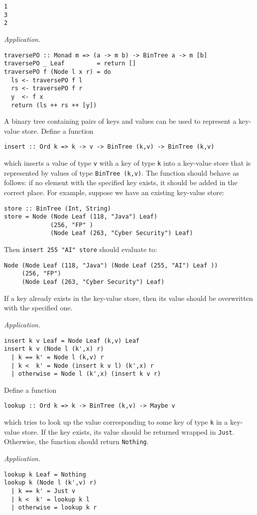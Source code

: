 \begin{parts}
\begin{subparts}
\texttt{1}\\
\texttt{3}\\
\texttt{2}  \droppoints 
\begin{solution}
\emph{Application.}
\begin{verbatim}
traversePO :: Monad m => (a -> m b) -> BinTree a -> m [b]
traversePO _ Leaf         = return []
traversePO f (Node l x r) = do 
  ls <- traversePO f l 
  rs <- traversePO f r
  y  <- f x
  return (ls ++ rs ++ [y])
\end{verbatim}
\end{solution}
\subpart[4] A binary tree containing pairs of keys and values can be used to represent a key-value store. Define a function 
\begin{center}
	\texttt{insert :: Ord k => k -> v -> BinTree (k,v) -> BinTree (k,v)}
\end{center}
which inserts a value of type \texttt{v} with a key of type \texttt{k} into a key-value store that is represented by values of type \texttt{BinTree (k,v)}. The function should behave as follows: if no element with the specified key exists, it should be added in the correct place. For example, suppose we have an existing key-value store:
\begin{verbatim}
store :: BinTree (Int, String)
store = Node (Node Leaf (118, "Java") Leaf) 
             (256, "FP" ) 
             (Node Leaf (263, "Cyber Security") Leaf)
\end{verbatim}
Then \texttt{insert 255 "AI" store} should evaluate to:
\begin{verbatim}
Node (Node Leaf (118, "Java") (Node Leaf (255, "AI") Leaf )) 
     (256, "FP") 
     (Node Leaf (263, "Cyber Security") Leaf)
\end{verbatim}
If a key already exists in the key-value store, then its value should be overwritten with the specified one. \droppoints 
\begin{solution}
\emph{Application.}
\begin{verbatim}
insert k v Leaf = Node Leaf (k,v) Leaf 
insert k v (Node l (k',x) r)
  | k == k' = Node l (k,v) r
  | k <  k' = Node (insert k v l) (k',x) r
  | otherwise = Node l (k',x) (insert k v r)
\end{verbatim}
\end{solution}
\pagebreak
\subpart[4] Define a function 
\begin{center}
	\texttt{lookup :: Ord k => k -> BinTree (k,v) -> Maybe v}
\end{center}
which tries to look up the value corresponding to some key of type \texttt{k} in a key-value store. If the key exists, its value should be returned wrapped in \texttt{Just}. Otherwise, the function should return \texttt{Nothing}. \droppoints 
\begin{solution}
\emph{Application.}
\begin{verbatim}
lookup k Leaf = Nothing 
lookup k (Node l (k',v) r)
  | k == k' = Just v 
  | k <  k' = lookup k l 
  | otherwise = lookup k r
\end{verbatim}
\end{solution}
\end{subparts}

\end{parts}
